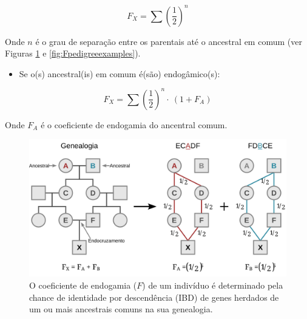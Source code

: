 \documentclass[
]{book}
\providecommand{\tightlist}{%
  \setlength{\itemsep}{0pt}\setlength{\parskip}{0pt}}
\begin{document}
\[F_X = \sum \left( \frac{1}{2} \right)^n\]

Onde
\(n\) é o grau de separação entre os parentais até o ancestral em comum (ver Figuras \ref{fig:Fpedigree} e \ref{fig:Fpedigreeexamples}).

\begin{itemize}
\tightlist
\item
  Se o(s) ancestral(is) em comum é(são) endogâmico(s):
\end{itemize}

\[F_X = \sum \left( \frac{1}{2} \right)^n \cdot \ \left( 1 + F_A \right)\]

Onde
\(F_A\) é o coeficiente de endogamia do ancentral comum.

\begin{figure}

{\centering \includegraphics[width=800px]{figs/inbreeding_coeficient_genalogy} 

}

\caption{O coeficiente de endogamia ($F$) de um indivíduo é determinado pela chance de identidade por descendência (IBD) de genes herdados de um ou mais ancestrais comuns na sua genealogia.}\label{fig:Fpedigree}
\end{figure}
\end{document}

